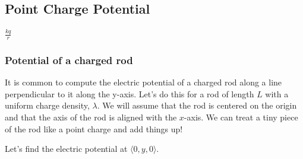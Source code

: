 \subsection{Point Charge Potential}\label{point-charge-potential}

\begin{Shaded}
\begin{Highlighting}[]

\OperatorTok{=}\NormalTok{)}

\OperatorTok{=}\NormalTok{)}

\OperatorTok{=}\OperatorTok{*}\OperatorTok{/}

\end{Highlighting}
\end{Shaded}

\(\displaystyle \frac{k q}{r}\)

\subsubsection{Potential of a charged
rod}\label{potential-of-a-charged-rod}

It is common to compute the electric potential of a charged rod along a
line perpendicular to it along the y-axis. Let's do this for a rod of
length \(L\) with a uniform charge density, \(\lambda\). We will assume
that the rod is centered on the origin and that the axis of the rod is
aligned with the \(x\)-axis. We can treat a tiny piece of the rod like a
point charge and add things up!

Let's find the electric potential at \(\langle 0,y,0 \rangle\).


